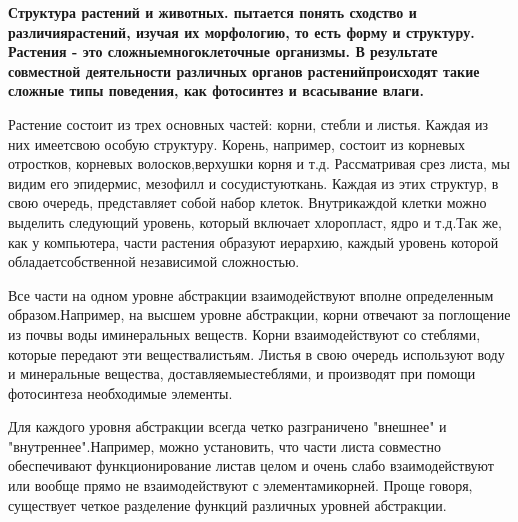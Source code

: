 \documentclass[11pt]{article}
\begin{document}
\bf Структура растений и животных.  пытается понять сходство и различия\linebreak растений, изучая их морфологию, то есть форму и структуру. Растения - это сложные\linebreak многоклеточные организмы. В результате совместной деятельности различных органов растений\linebreak происходят такие сложные типы поведения, как фотосинтез и всасывание влаги. \bigskip

Растение состоит из трех основных частей: корни, стебли и листья. Каждая из них имеет\linebreak свою особую структуру. Корень, например, состоит из корневых отростков, корневых волосков,\linebreak верхушки корня и т.д. Рассматривая срез листа, мы видим его эпидермис, мезофилл и сосудистую\linebreak ткань. Каждая из этих структур, в свою очередь, представляет собой набор клеток. Внутри\linebreak каждой клетки можно выделить следующий уровень, который включает хлоропласт, ядро и т.д.\linebreak Так же, как у компьютера, части растения образуют иерархию, каждый уровень которой обладает\linebreak собственной независимой сложностью. \bigskip 

Все части на одном уровне абстракции взаимодействуют вполне определенным образом.\linebreak Например, на высшем уровне абстракции, корни отвечают за поглощение из почвы воды и\linebreak минеральных веществ. Корни взаимодействуют со стеблями, которые передают эти вещества\linebreak листьям. Листья в свою очередь используют воду и минеральные вещества, доставляемые\linebreak стеблями, и производят при помощи фотосинтеза необходимые элементы. \bigskip 

Для каждого уровня абстракции всегда четко разграничено "внешнее" и "внутреннее".\linebreak Например, можно установить, что части листа совместно обеспечивают функционирование листа\linebreak в целом и очень слабо взаимодействуют или вообще прямо не взаимодействуют с элементами\linebreak корней. Проще говоря, существует четкое разделение функций различных уровней абстракции. \bigskip 
\end{document}
